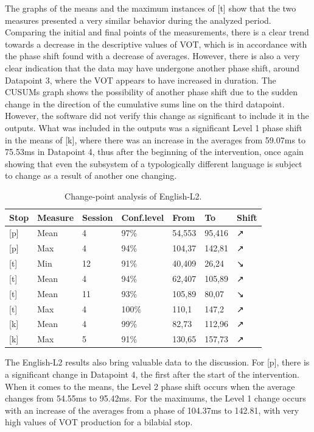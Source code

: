 The graphs of the means and the maximum instances of [t] show that the two
measures presented a very similar behavior during the analyzed period.
Comparing the initial and final points of the measurements, there is a clear
trend towards a decrease in the descriptive values of VOT, which is in
accordance with the phase shift found with a decrease of averages. However,
there is also a very clear indication that the data may have undergone another
phase shift, around Datapoint 3, where the VOT appears to have increased in
duration. The CUSUMs graph shows the possibility of another phase shift due to
the sudden change in the direction of the cumulative sums line on the third
datapoint. However, the software did not verify this change as significant to
include it in the outputs. What was included in the outputs was a significant
Level 1 phase shift in the means of [k], where there was an increase in the
averages from 59.07ms to 75.53ms in Datapoint 4, thus after the beginning of
the intervention, once again showing that even the subsystem of a typologically
different language is subject to change as a result of another one changing.


\begin{table}[h]
\caption{Change-point analysis of English-L2.}\label{laura-table02}
\begin{tabular}{@{}lllllll@{}}
\toprule
\textbf{Stop} & \textbf{Measure} & \textbf{Session} & \textbf{Conf.level} & \textbf{From} & \textbf{To} & \textbf{Shift} \\
\midrule 
{[}p{]} & Mean & 4 & 97\% & 54,553 & 95,416 & ↗ \\
{[}p{]} & Max & 4 & 94\% & 104,37 & 142,81 & ↗ \\
{[}t{]} & Min & 12 & 91\% & 40,409 & 26,24 & ↘ \\
{[}t{]} & Mean & 4 & 94\% & 62,407 & 105,89 & ↗ \\
{[}t{]} & Mean & 11 & 93\% & 105,89 & 80,07 & ↘ \\
{[}t{]} & Max & 4 & 100\% & 110,1 & 147,2 & ↗ \\
{[}k{]} & Mean & 4 & 99\% & 82,73 & 112,96 & ↗ \\
{[}k{]} & Max & 5 & 91\% & 130,65 & 157,73 & ↗ \\
\bottomrule
\end{tabular}
\end{table}

The English-L2 results also bring valuable data to the discussion. For [p],
there is a significant change in Datapoint 4, the first after the start of the
intervention. When it comes to the means, the Level 2 phase shift occurs when
the average changes from 54.55ms to 95.42ms. For the maximums, the Level 1
change occurs with an increase of the averages from a phase of 104.37ms to
142.81, with very high values of VOT production for a bilabial stop.


